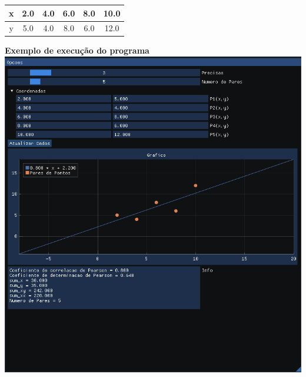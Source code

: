 \documentclass[14pt, letterpaper]{article}
\begin{document}
\begin{center}
  \begin{tabular}{|c | c | c | c | c | c|}
    \hline
    x & 2.0 & 4.0 & 6.0 & 8.0 & 10.0\\ 
    \hline
    y & 5.0 & 4.0 & 8.0 & 6.0 & 12.0\\ 
    \hline
  \end{tabular}
\end{center}

\begin{spacing}{2.5}
\end{spacing}

\begin{center}
  \textbf{Exemplo de execução do programa\\[5.0mm]}
  \includegraphics[scale=0.4]{exemplo}
\end{center}
\end{document}
